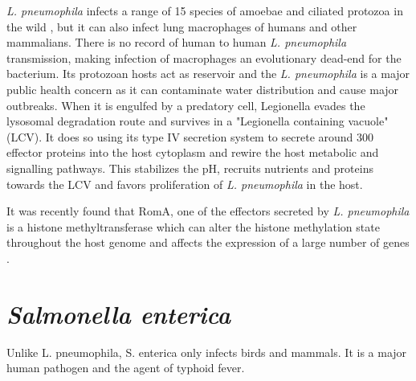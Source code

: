 \textit{L. pneumophila} infects a range of 15 species of amoebae and ciliated protozoa in the wild \cite{Rowbotham1980}, but it can also infect lung macrophages of humans and other mammalians.
There is no record of human to human \textit{L. pneumophila} transmission, making infection of macrophages an evolutionary dead-end for the bacterium. Its protozoan hosts act as reservoir and the \textit{L. pneumophila} is a major public health concern as it can contaminate water distribution and cause major outbreaks. When it is engulfed by a predatory cell, Legionella evades the lysosomal degradation route and survives in a "Legionella containing vacuole" (LCV). It does so using its type IV secretion system to secrete around 300 effector proteins into the host cytoplasm and rewire the host metabolic and signalling pathways. This stabilizes the pH, recruits nutrients and proteins towards the LCV and favors proliferation of \textit{L. pneumophila} in the host.

It was recently found that RomA, one of the effectors secreted by \textit{L. pneumophila} is a histone methyltransferase which can alter the histone methylation state throughout the host genome and affects the expression of a large number of genes \cite{Rolando2013}.

\section{\textit{Salmonella enterica}}

Unlike {L. pneumophila}, {S. enterica} only infects birds and mammals. It is a major human pathogen and the agent of typhoid fever.